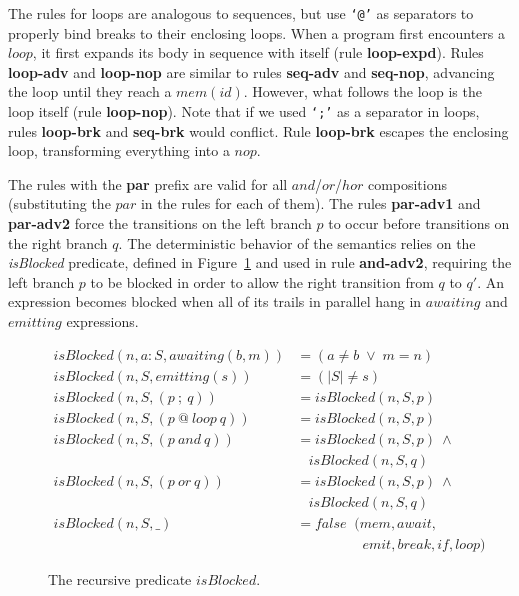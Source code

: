 \documentclass{acm_proc_article-sp}
\newcommand{\code}[1] {{\small{\texttt{#1}}}}
\newcommand{\rr}[1] {{\textbf{\scriptsize{#1}}}}
\newcommand{\1}{\;}
\newcommand{\2}{\;\;}
\newcommand{\3}{\;\;\;}
\newcommand{\5}{\;\;\;\;\;}
\begin{document}
The rules for loops are analogous to sequences, but use \code{`@'} as 
separators to properly bind breaks to their enclosing loops.
%
When a program first encounters a $loop$, it first expands its body in sequence 
with itself (rule \textbf{loop-expd}).
Rules \textbf{loop-adv} and \textbf{loop-nop} are similar to rules 
\textbf{seq-adv} and \textbf{seq-nop}, advancing the loop until they reach a 
$mem(id)$.
However, what follows the loop is the loop itself (rule \textbf{loop-nop}).
Note that if we used \code{`;'} as a separator in loops, rules 
\textbf{loop-brk} and \textbf{seq-brk} would conflict.
%
Rule \textbf{loop-brk} escapes the enclosing loop, transforming everything into 
a $nop$.

The rules with the \rr{par} prefix are valid for all $and$/$or$/$hor$ 
compositions (substituting the $par$ in the rules for each of them).
%
The rules \rr{par-adv1} and \rr{par-adv2} force the transitions on the left 
branch $p$ to occur before transitions on the right branch $q$.
%
The deterministic behavior of the semantics relies on the \emph{isBlocked} 
predicate, defined in Figure~\ref{fig.isBlocked} and used in rule 
\textbf{and-adv2}, requiring the left branch $p$ to be blocked in order to 
allow the right transition from $q$ to $q'$.
%
An expression becomes blocked when all of its trails in parallel hang in 
$awaiting$ and $emitting$ expressions.

\begin{figure}[t]
{\small
\begin{align*}
  isBlocked(n,a:S, awaiting(b,m)) &= (a \neq b \1\vee\1 m = n)   \\
  isBlocked(n,S, emitting(s))    &= (|S| \neq s)                     \\
  isBlocked(n,S, (p~;~q))        &= isBlocked(n,S,p)             \\
  isBlocked(n,S, (p~@~loop~q))   &= isBlocked(n,S,p)             \\
  isBlocked(n,S, (p~and~q))      &= isBlocked(n,S,p)~\wedge
                               \\&~~~~isBlocked(n,S,q)             \\
  isBlocked(n,S, (p~or~q))       &= isBlocked(n,S,p)~\wedge
                               \\&~~~~isBlocked(n,S,q)             \\
  isBlocked(n,S, \_)             &= false \2  (mem,await,      \\
                                  &    \5\5\5\2 emit,break,if,loop)   %
\end{align*}
}%
\caption{
The recursive predicate $isBlocked$.
\label{fig.isBlocked}
}
\end{figure}
\end{document}
